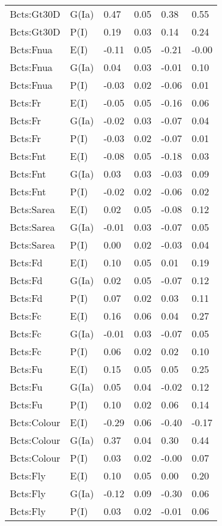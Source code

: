 \begin{center}
\begin{longtable}{|p{1.1in}|p{0.7in}|p{0.7in}|p{0.6in}|p{0.6in}|p{0.6in}|}
  Bcts:Gt30D & G(Ia) & 0.47 & 0.05 & 0.38 & 0.55 \\ 
  Bcts:Gt30D & P(I) & 0.19 & 0.03 & 0.14 & 0.24 \\ 
  Bcts:Fnua & E(I) & -0.11 & 0.05 & -0.21 & -0.00 \\ 
  Bcts:Fnua & G(Ia) & 0.04 & 0.03 & -0.01 & 0.10 \\ 
  Bcts:Fnua & P(I) & -0.03 & 0.02 & -0.06 & 0.01 \\ 
  Bcts:Fr & E(I) & -0.05 & 0.05 & -0.16 & 0.06 \\ 
  Bcts:Fr & G(Ia) & -0.02 & 0.03 & -0.07 & 0.04 \\ 
  Bcts:Fr & P(I) & -0.03 & 0.02 & -0.07 & 0.01 \\ 
  Bcts:Fnt & E(I) & -0.08 & 0.05 & -0.18 & 0.03 \\ 
  Bcts:Fnt & G(Ia) & 0.03 & 0.03 & -0.03 & 0.09 \\ 
  Bcts:Fnt & P(I) & -0.02 & 0.02 & -0.06 & 0.02 \\ 
  Bcts:Sarea & E(I) & 0.02 & 0.05 & -0.08 & 0.12 \\ 
  Bcts:Sarea & G(Ia) & -0.01 & 0.03 & -0.07 & 0.05 \\ 
  Bcts:Sarea & P(I) & 0.00 & 0.02 & -0.03 & 0.04 \\ 
  Bcts:Fd & E(I) & 0.10 & 0.05 & 0.01 & 0.19 \\ 
  Bcts:Fd & G(Ia) & 0.02 & 0.05 & -0.07 & 0.12 \\ 
  Bcts:Fd & P(I) & 0.07 & 0.02 & 0.03 & 0.11 \\ 
  Bcts:Fc & E(I) & 0.16 & 0.06 & 0.04 & 0.27 \\ 
  Bcts:Fc & G(Ia) & -0.01 & 0.03 & -0.07 & 0.05 \\ 
  Bcts:Fc & P(I) & 0.06 & 0.02 & 0.02 & 0.10 \\ 
  Bcts:Fu & E(I) & 0.15 & 0.05 & 0.05 & 0.25 \\ 
  Bcts:Fu & G(Ia) & 0.05 & 0.04 & -0.02 & 0.12 \\ 
  Bcts:Fu & P(I) & 0.10 & 0.02 & 0.06 & 0.14 \\ 
  Bcts:Colour & E(I) & -0.29 & 0.06 & -0.40 & -0.17 \\ 
  Bcts:Colour & G(Ia) & 0.37 & 0.04 & 0.30 & 0.44 \\ 
  Bcts:Colour & P(I) & 0.03 & 0.02 & -0.00 & 0.07 \\ 
  Bcts:Fly & E(I) & 0.10 & 0.05 & 0.00 & 0.20 \\ 
  Bcts:Fly & G(Ia) & -0.12 & 0.09 & -0.30 & 0.06 \\ 
  Bcts:Fly & P(I) & 0.03 & 0.02 & -0.01 & 0.06 \\ 

\end{longtable}
\end{center}
